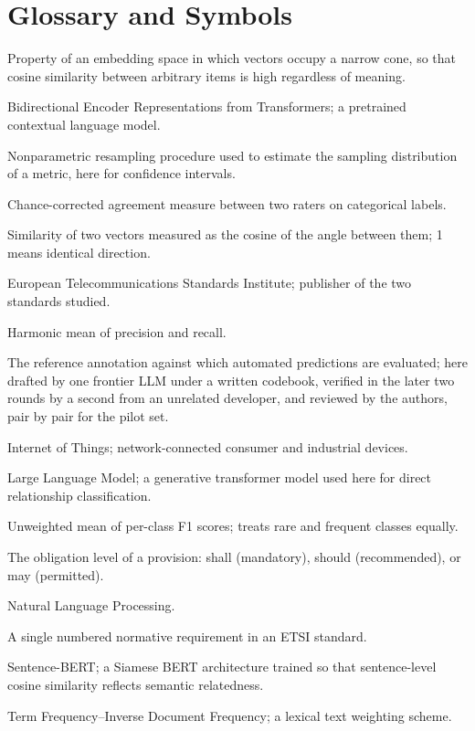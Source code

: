 \chapter*{Glossary and Symbols}

\begin{description}[style=multiline,leftmargin=3cm,font=\bfseries]
  \item[Anisotropy] Property of an embedding space in which vectors occupy a
  narrow cone, so that cosine similarity between arbitrary items is high
  regardless of meaning.
  \item[BERT] Bidirectional Encoder Representations from Transformers; a
  pretrained contextual language model.
  \item[Bootstrap] Nonparametric resampling procedure used to estimate the
  sampling distribution of a metric, here for confidence intervals.
  \item[Cohen's kappa ($\kappa$)] Chance-corrected agreement measure between
  two raters on categorical labels.
  \item[Cosine similarity] Similarity of two vectors measured as the cosine
  of the angle between them; 1 means identical direction.
  \item[ETSI] European Telecommunications Standards Institute; publisher of
  the two standards studied.
  \item[F1 score] Harmonic mean of precision and recall.
  \item[Ground truth] The reference annotation against which automated
  predictions are evaluated; here drafted by one frontier LLM under a written
  codebook, verified in the later two rounds by a second from an unrelated
  developer, and reviewed by the authors, pair by pair for the pilot set.
  \item[IoT] Internet of Things; network-connected consumer and industrial
  devices.
  \item[LLM] Large Language Model; a generative transformer model used here
  for direct relationship classification.
  \item[Macro-F1] Unweighted mean of per-class F1 scores; treats rare and
  frequent classes equally.
  \item[Modality] The obligation level of a provision: shall (mandatory),
  should (recommended), or may (permitted).
  \item[NLP] Natural Language Processing.
  \item[Provision] A single numbered normative requirement in an ETSI
  standard.
  \item[SBERT] Sentence-BERT; a Siamese BERT architecture trained so that
  sentence-level cosine similarity reflects semantic relatedness.
  \item[TF--IDF] Term Frequency--Inverse Document Frequency; a lexical text
  weighting scheme.
\end{description}
